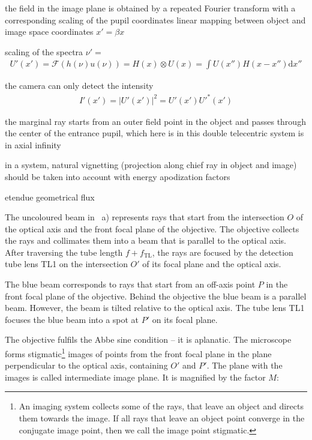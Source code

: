 the field in the image plane is obtained by a repeated Fourier
transform with a corresponding scaling of the pupil coordinates
linear mapping between object and image space coordinates $x'=\beta x$

scaling of the spectra $\nu'=$
\begin{align}
U'(x')=\mathcal{F}(h(\nu) u(\nu)) = H(x) \otimes U(x) = \int U(x'') H(x-x'') \textrm{d}x''
\end{align}

the camera can only detect the intensity
\begin{align}
I'(x')=|U'(x')|^2=U'(x')U'^*(x')
\end{align}

the marginal ray starts from an outer field point in the object and
passes through the center of the entrance pupil, which here is in
this double telecentric system is in axial infinity 

in a system, natural vignetting (projection along chief ray in object
and image) should be taken into account with energy apodization
factors

etendue
geometrical flux



The uncoloured beam in ~a) represents
rays that start from the intersection $O$ of the optical axis and the
front focal plane of the objective. The objective collects the rays
and collimates them into a beam that is parallel to the optical
axis. After traversing the tube length $f+f_\mathrm{TL}$, the rays are
focused by the detection tube lens TL1 on the intersection $O'$ of its
focal plane and the optical axis. 

The blue beam corresponds to rays that start from an off-axis point
$P$ in the front focal plane of the objective. Behind the objective
the blue beam is a parallel beam. However, the beam is tilted relative
to the optical axis. The tube lens TL1 focuses the blue beam into a
spot at $P'$ on its focal plane.

The objective fulfils the Abbe sine condition -- it is aplanatic. The
microscope forms stigmatic\footnote{An imaging system collects some of
  the rays, that leave an object and directs them towards the
  image. If all rays that leave an object point converge in the
  conjugate image point, then we call the image point stigmatic.}
images of points from the front focal plane in the plane perpendicular
to the optical axis, containing $O'$ and $P'$. The plane with the
images is called intermediate image plane. It is magnified by the
factor $M$:


